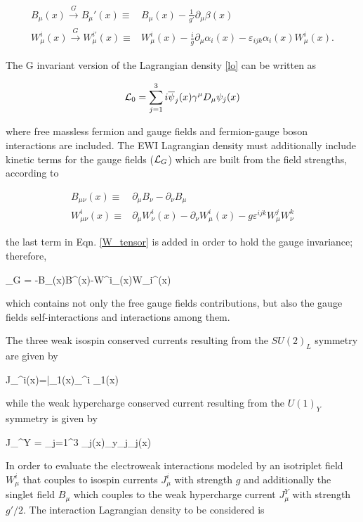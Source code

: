 \begin{align}\label{f_transf}
B_\mu(x) \xrightarrow[]{G} B_\mu'(x)\equiv & B_\mu(x)
- \frac{1}{g'}\partial_\mu\beta(x) \nonumber\\
W^i_\mu(x) \xrightarrow[]{G} W_\mu^{i\prime}(x)\equiv & W^i_\mu(x) - \frac{i}{g}\partial_\mu \alpha_i(x) - \varepsilon_{ijk}\alpha_i(x)W^i_\mu(x).
\end{align}

The G invariant version of the Lagrangian density \ref{lo} can be written as

\begin{equation}\label{linv}
\mathcal{L}_0 = \sum_{j=1}^3 i\overline{\psi}_j(x)\gamma^\mu D_\mu \psi_j(x)
\end{equation}

\noindent where free massless fermion and gauge fields and fermion-gauge boson interactions are included. The EWI Lagrangian density must additionally include kinetic terms for the gauge fields ($\mathcal{L}_G$) which are built from the field strengths, according to

\begin{align}
B_{\mu\nu}(x)   \equiv & \partial_\mu B_\nu -  \partial_\nu B_\mu \label{B_tensor} \\ 
W^i_{\mu\nu}(x) \equiv & \partial_\mu W^i_\nu(x) - \partial_\nu W^i_\mu(x) - g\varepsilon^{ijk}W^j_\mu W^k_\nu \label{W_tensor}
\end{align}

\noindent the last term in Eqn. \ref{W_tensor} is added in order to hold the gauge invariance; therefore,

\beqn\label{lg}
\Lagr_G = -B_{\mu\nu}(x)B^{\mu\nu}(x)-W^i_{\mu\nu}(x)W_i^{\mu\nu}(x)
\eeqn

\noindent which contains not only the free gauge fields contributions, but also the gauge fields self-interactions and interactions among them.

The three weak isospin conserved currents resulting from the $SU(2)_L$ symmetry are given by

\beqn
J_\mu^i(x)=\bar{\psi_1}(x)\gamma_\mu \sigma^i \psi_1(x) 
\eeqn

\noindent while the weak hypercharge conserved current resulting from the $U(1)_Y$ symmetry is given by 

\beqn
J_\mu^Y = \sum_{j=1}^3 \overline{\psi}_j(x)\gamma_\mu y_j\psi_j(x)
\eeqn

In order to evaluate the electroweak interactions modeled by an isotriplet field $W^i_\mu$ that couples to isospin currents $J^i_\mu$ with strength $g$ and additionally the singlet field $B_\mu$ which couples to the weak hypercharge current $J_\mu^Y$ with strength $g'/2$. The interaction Lagrangian density to be considered is

